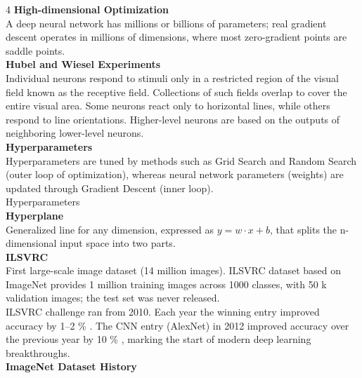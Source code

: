 \documentclass[8pt]{extarticle}
\begin{document}
\begin{multicols}{4}
\vspace{2pt}\textbf{High-dimensional Optimization}\\
A deep neural network has millions or billions of parameters; real gradient descent operates in millions of dimensions, where most zero-gradient points are saddle points.\\
\vspace{2pt}\textbf{Hubel and Wiesel Experiments}\\
Individual neurons respond to stimuli only in a restricted region of the visual field known as the receptive field. Collections of such fields overlap to cover the entire visual area. Some neurons react only to horizontal lines, while others respond to line orientations. Higher-level neurons are based on the outputs of neighboring lower-level neurons.\\
\vspace{2pt}\textbf{Hyperparameters}\\
Hyperparameters are tuned by methods such as Grid Search and Random Search (outer loop of optimization), whereas neural network parameters (weights) are updated through Gradient Descent (inner loop).\\
Hyperparameters\\
\vspace{2pt}\textbf{Hyperplane}\\
Generalized line for any dimension, expressed as $y = w\cdot x + b$, that splits the n-dimensional input space into two parts.\\
\vspace{2pt}\textbf{ILSVRC}\\
First large-scale image dataset (14 million images). ILSVRC dataset based on ImageNet provides 1 million training images across 1000 classes, with 50 k validation images; the test set was never released.\\
ILSVRC challenge ran from 2010. Each year the winning entry improved accuracy by 1--2 \% . The CNN entry (AlexNet) in 2012 improved accuracy over the previous year by 10 \% , marking the start of modern deep learning breakthroughs.\\
\vspace{2pt}\textbf{ImageNet Dataset History}\\


\end{multicols}
\end{document}
